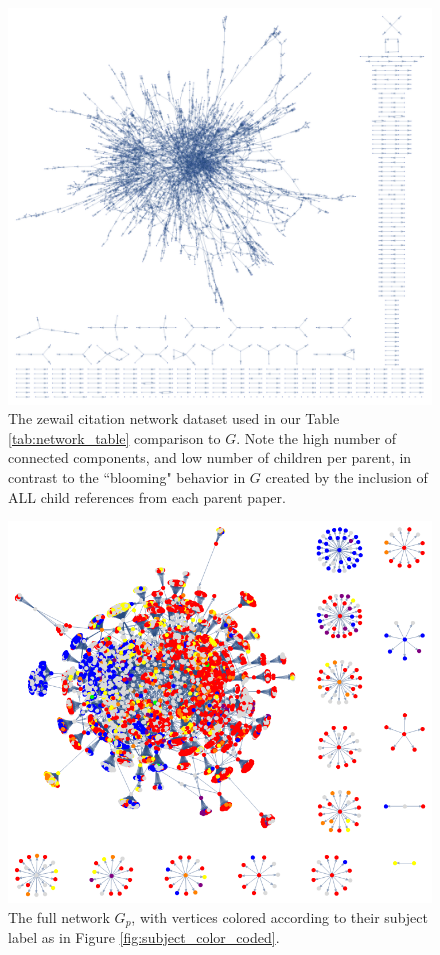 \documentclass[12pt]{thesis}
\theoremstyle{plain}
\theoremstyle{definition}
\theoremstyle{remark}
\begin{document}
{\begin{figure}[H]
\centering
\includegraphics[width=\textwidth]{display_zewail.png}
\caption{The zewail citation network dataset used in our Table \ref{tab:network_table} comparison to $G$. Note the high number of connected components, and low number of children per parent, in contrast to the ``blooming" behavior in $G$ created by the inclusion of ALL child references from each parent paper.}
\label{fig:zewail}
\end{figure}

\begin{figure}[H]
\centering
\includegraphics[width=\textwidth]{full_network_color_coded.png}
\caption{The full network $G_p$, with vertices colored according to their subject label as in Figure \ref{fig:subject_color_coded}.}
\label{fig:full_subject_color_coded}
\end{figure}

}
\end{document}

